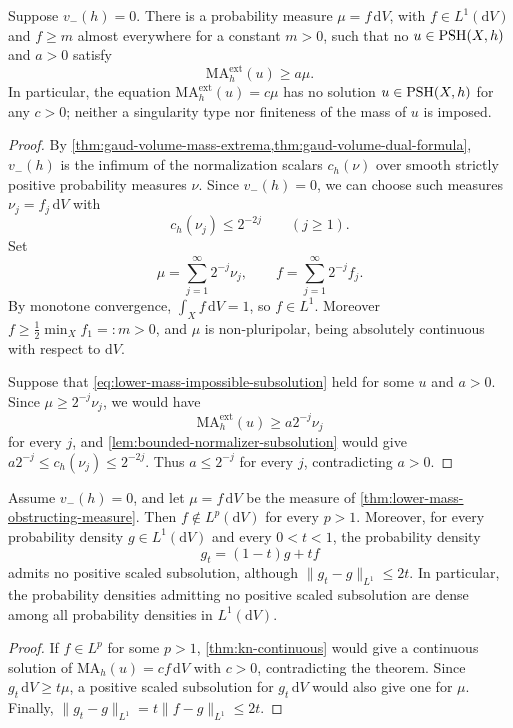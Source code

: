 \begin{theorem}\label{thm:lower-mass-obstructing-measure}
Suppose $v_-(h)=0$. There is a probability measure $\mu=f\,\mathrm{d}V$, with $f\in L^1(\mathrm{d}V)$ and $f\geq m$ almost everywhere for a constant $m>0$, such that no $u\in\mathrm{PSH}(X,h)$ and $a>0$ satisfy
\begin{equation}\label{eq:lower-mass-impossible-subsolution}
 \mathrm{MA}^{\mathrm{ext}}_h(u)\geq a\mu.
\end{equation}
In particular, the equation $\mathrm{MA}^{\mathrm{ext}}_h(u)=c\mu$ has no solution $u\in\mathrm{PSH}(X,h)$ for any $c>0$; neither a singularity type nor finiteness of the mass of $u$ is imposed.
\end{theorem}
\begin{proof}
By \cref{thm:gaud-volume-mass-extrema,thm:gaud-volume-dual-formula}, $v_-(h)$ is the infimum of the normalization scalars $c_h(\nu)$ over smooth strictly positive probability measures $\nu$. Since $v_-(h)=0$, we can choose such measures $\nu_j=f_j\,\mathrm{d}V$ with
\[
 c_h(\nu_j)\leq 2^{-2j}\qquad(j\geq1).
\]
Set
\[
 \mu=\sum_{j=1}^{\infty}2^{-j}\nu_j,
 \qquad f=\sum_{j=1}^{\infty}2^{-j}f_j.
\]
By monotone convergence, $\int_Xf\,\mathrm{d}V=1$, so $f\in L^1$. Moreover $f\geq\tfrac12\min_X f_1=:m>0$, and $\mu$ is non-pluripolar, being absolutely continuous with respect to $\mathrm{d}V$.

Suppose that \eqref{eq:lower-mass-impossible-subsolution} held for some $u$ and $a>0$. Since $\mu\geq2^{-j}\nu_j$, we would have
\[
 \mathrm{MA}^{\mathrm{ext}}_h(u)\geq a2^{-j}\nu_j
\]
for every $j$, and \cref{lem:bounded-normalizer-subsolution} would give $a2^{-j}\leq c_h(\nu_j)\leq2^{-2j}$. Thus $a\leq2^{-j}$ for every $j$, contradicting $a>0$.
\end{proof}

\begin{corollary}\label{cor:lower-mass-lone-instability}
Assume $v_-(h)=0$, and let $\mu=f\,\mathrm{d}V$ be the measure of \cref{thm:lower-mass-obstructing-measure}. Then $f\notin L^p(\mathrm{d}V)$ for every $p>1$. Moreover, for every probability density $g\in L^1(\mathrm{d}V)$ and every $0<t<1$, the probability density
\[
 g_t=(1-t)g+tf
\]
admits no positive scaled subsolution, although $\|g_t-g\|_{L^1}\leq2t$. In particular, the probability densities admitting no positive scaled subsolution are dense among all probability densities in $L^1(\mathrm{d}V)$.
\end{corollary}
\begin{proof}
If $f\in L^p$ for some $p>1$, \cref{thm:kn-continuous} would give a continuous solution of $\mathrm{MA}_h(u)=cf\,\mathrm{d}V$ with $c>0$, contradicting the theorem. Since $g_t\,\mathrm{d}V\geq t\mu$, a positive scaled subsolution for $g_t\,\mathrm{d}V$ would also give one for $\mu$. Finally,
$\|g_t-g\|_{L^1}=t\|f-g\|_{L^1}\leq2t$.
\end{proof}

